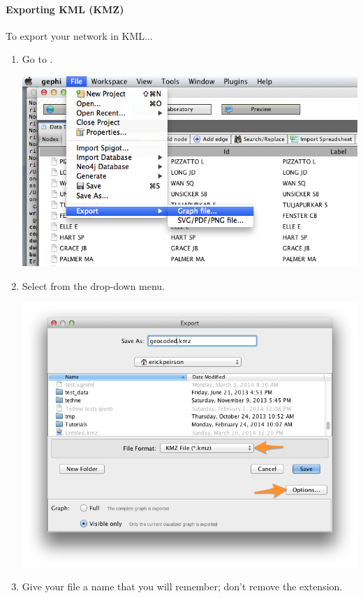 \documentclass[letterpaper,10pt,english]{sphinxmanual}
\begin{document}
\paragraph{Exporting KML (KMZ)}
\label{tutorial.geonetworks:exporting-kml-kmz}
To export your network in KML...
\begin{enumerate}
\item {} 
Go to .

{\hfill\includegraphics{geo10.png}\hfill}

\item {} 
Select  from the  drop-down menu.

{\hfill\includegraphics{geo11.png}\hfill}

\item {} 
Give your file a name that you will remember; don't remove the  extension.


\end{enumerate}
\end{document}

